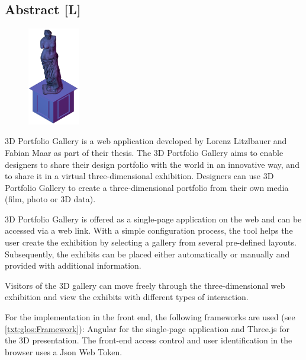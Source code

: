 \begin{spacing}{1}
    \chapter*{Abstract [L]}
\end{spacing}
\begin{figure}
    \begin{center}
      \includegraphics[width=0.2\textwidth]{pics/statue.png}
    \end{center}
\end{figure}
3D Portfolio Gallery is a web application developed by Lorenz Litzlbauer and Fabian Maar as part of their thesis. The 3D Portfolio Gallery aims to enable designers to share their design portfolio with the world in an innovative way, and to share it in a virtual three-dimensional exhibition. Designers can use 3D Portfolio Gallery to create a three-dimensional portfolio from their own media (film, photo or 3D data).



3D Portfolio Gallery is offered as a single-page application on the web and can be accessed via a web link. With a simple configuration process, the tool helps the user create the exhibition by selecting a gallery from several pre-defined layouts. Subsequently, the exhibits can be placed either automatically or manually and provided with additional information.



Visitors of the 3D gallery can move freely through the three-dimensional web exhibition and view the exhibits with different types of interaction.



For the implementation in the front end, the following frameworks are used (see \ref{txt:glos:Framework}): Angular for the single-page application and Three.js for the 3D presentation. The front-end access control and user identification in the browser uses a Json Web Token.



